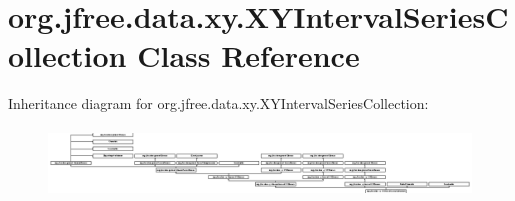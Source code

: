 \hypertarget{classorg_1_1jfree_1_1data_1_1xy_1_1_x_y_interval_series_collection}{}\section{org.\+jfree.\+data.\+xy.\+X\+Y\+Interval\+Series\+Collection Class Reference}
\label{classorg_1_1jfree_1_1data_1_1xy_1_1_x_y_interval_series_collection}
Inheritance diagram for org.\+jfree.\+data.\+xy.\+X\+Y\+Interval\+Series\+Collection\+:\begin{figure}[H]
\begin{center}
\leavevmode
\includegraphics[height=1.846154cm]{classorg_1_1jfree_1_1data_1_1xy_1_1_x_y_interval_series_collection}
\end{center}
\end{figure}
